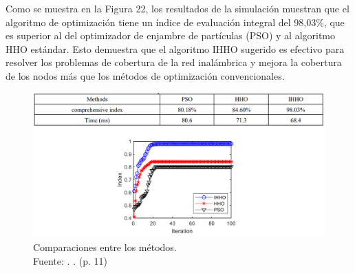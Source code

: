 \newpage
Como se muestra en la Figura 22, los resultados de la simulación muestran que el algoritmo de optimización tiene un índice de evaluación integral del 98,03\%, que es superior al del optimizador de enjambre de partículas (PSO) y al algoritmo HHO estándar. Esto demuestra que el algoritmo IHHO sugerido es efectivo para resolver los problemas de cobertura de la red inalámbrica y mejora la cobertura de los nodos más que los métodos de optimización convencionales.

\begin{figure}[!ht]
	\begin{center}
		\includegraphics[width=1\textwidth]{2/figures/dou2023_2.png}
		\caption[Comparaciones entre los métodos]{Comparaciones entre los métodos.\\
			Fuente: \cite{pr_dou2023researchwir}. . (p. 11)}
		\label{2:fig130}
	\end{center}
\end{figure}